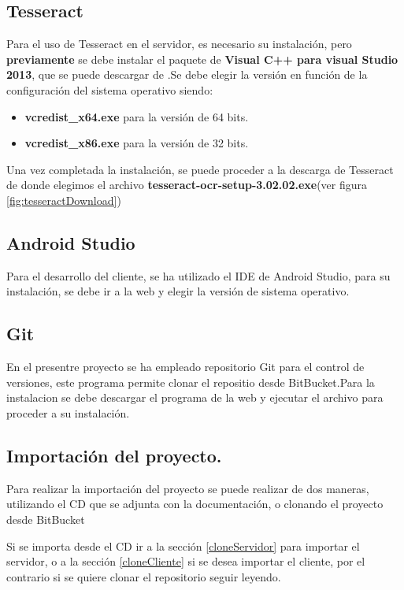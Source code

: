 	\subsection{Tesseract}
	Para el uso de Tesseract en el servidor, es necesario su instalación, pero \textbf{previamente} se debe instalar el paquete de \textbf{Visual C++ para visual Studio 2013}, que se puede descargar de \cite{paqueteVisual}.Se debe elegir la versión en función de la configuración del sistema operativo siendo:
	\begin{itemize}
		\item \textbf{vcredist\_x64.exe} para la versión de 64 bits.
		\item \textbf{vcredist\_x86.exe} para la versión de 32 bits.
	\end{itemize}
Una vez completada la instalación, se puede proceder a la descarga de Tesseract de \cite{tesseract} donde elegimos el archivo \textbf{tesseract-ocr-setup-3.02.02.exe}(ver figura \ref{fig:tesseractDownload})

	
	\subsection{Android Studio}
	Para el desarrollo del cliente, se ha utilizado el IDE de Android Studio, para su instalación, se debe ir a la web \cite{androidStudio} y elegir la versión de sistema operativo.
	
	\subsection{Git}
	En el presentre proyecto se ha empleado repositorio Git para el control de versiones, este programa permite clonar el repositio desde BitBucket.Para la instalacion se debe descargar el programa de la web \cite{git} y ejecutar el archivo para proceder a su instalación.

\subsection{Importación del proyecto.}
Para realizar la importación del proyecto se puede realizar de dos maneras, utilizando el CD que se adjunta con la documentación, o clonando el proyecto desde BitBucket

Si se importa desde el CD ir a la sección \ref{cloneServidor} para importar el servidor, o a la sección \ref{cloneCliente} si se desea importar el cliente, por el contrario si se quiere clonar el repositorio seguir leyendo.
